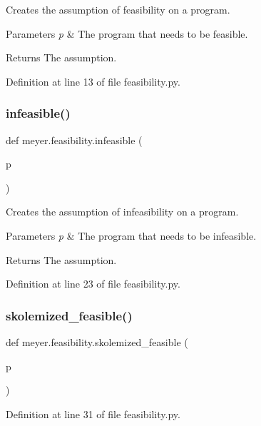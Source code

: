 Creates the assumption of feasibility on a program. 


\begin{DoxyParams}{Parameters}
{\em p} & The program that needs to be feasible. \\
\hline
\end{DoxyParams}
\begin{DoxyReturn}{Returns}
The assumption. 
\end{DoxyReturn}


Definition at line 13 of file feasibility.\+py.

\mbox{\label{namespacemeyer_1_1feasibility_a57a2c6e0b6e8f997f27de597de0aba79}} 
\subsubsection{\texorpdfstring{infeasible()}{infeasible()}}
{\footnotesize\ttfamily def meyer.\+feasibility.\+infeasible (\begin{DoxyParamCaption}\item[{}]{p }\end{DoxyParamCaption})}



Creates the assumption of infeasibility on a program. 


\begin{DoxyParams}{Parameters}
{\em p} & The program that needs to be infeasible. \\
\hline
\end{DoxyParams}
\begin{DoxyReturn}{Returns}
The assumption. 
\end{DoxyReturn}


Definition at line 23 of file feasibility.\+py.

\mbox{\label{namespacemeyer_1_1feasibility_a60f0122f899a01e6c5b69f43d7f29727}} 
\subsubsection{\texorpdfstring{skolemized\+\_\+feasible()}{skolemized\_feasible()}}
{\footnotesize\ttfamily def meyer.\+feasibility.\+skolemized\+\_\+feasible (\begin{DoxyParamCaption}\item[{}]{p }\end{DoxyParamCaption})}



Definition at line 31 of file feasibility.\+py.

